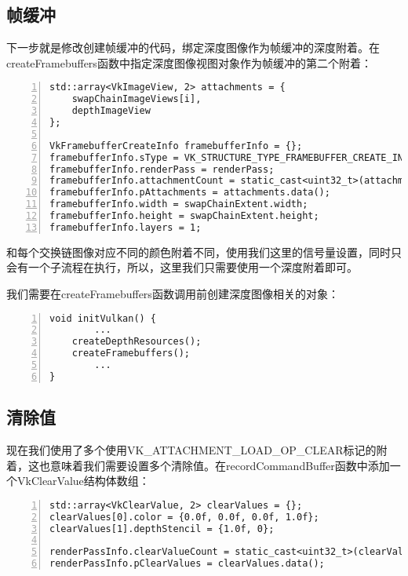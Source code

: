 \documentclass{ctexart}
\begin{document}
\subsection{帧缓冲}

下一步就是修改创建帧缓冲的代码，绑定深度图像作为帧缓冲的深度附着。在createFramebuffers函数中指定深度图像视图对象作为帧缓冲的第二个附着：

\begin{lstlisting}[language={[ANSI]C},keywordstyle=\color{blue!70},commentstyle=\color{red!50!green!50!blue!50},frame=shadowbox, rulesepcolor=\color{red!20!green!20!blue!20},basicstyle=\small,numbers=left, numberstyle=\tiny,breaklines=true]
std::array<VkImageView, 2> attachments = {
	swapChainImageViews[i],
	depthImageView
};

VkFramebufferCreateInfo framebufferInfo = {};
framebufferInfo.sType = VK_STRUCTURE_TYPE_FRAMEBUFFER_CREATE_INFO;
framebufferInfo.renderPass = renderPass;
framebufferInfo.attachmentCount = static_cast<uint32_t>(attachments.size());
framebufferInfo.pAttachments = attachments.data();
framebufferInfo.width = swapChainExtent.width;
framebufferInfo.height = swapChainExtent.height;
framebufferInfo.layers = 1;
\end{lstlisting}

和每个交换链图像对应不同的颜色附着不同，使用我们这里的信号量设置，同时只会有一个子流程在执行，所以，这里我们只需要使用一个深度附着即可。

我们需要在createFramebuffers函数调用前创建深度图像相关的对象：

\begin{lstlisting}[language={[ANSI]C},keywordstyle=\color{blue!70},commentstyle=\color{red!50!green!50!blue!50},frame=shadowbox, rulesepcolor=\color{red!20!green!20!blue!20},basicstyle=\small,numbers=left, numberstyle=\tiny,breaklines=true]
void initVulkan() {
		...
	createDepthResources();
	createFramebuffers();
		...
}
\end{lstlisting}

\subsection{清除值}

现在我们使用了多个使用VK\_ATTACHMENT\_LOAD\_OP\_CLEAR标记的附着，这也意味着我们需要设置多个清除值。在recordCommandBuffer函数中添加一个VkClearValue结构体数组：

\begin{lstlisting}[language={[ANSI]C},keywordstyle=\color{blue!70},commentstyle=\color{red!50!green!50!blue!50},frame=shadowbox, rulesepcolor=\color{red!20!green!20!blue!20},basicstyle=\small,numbers=left, numberstyle=\tiny,breaklines=true]
std::array<VkClearValue, 2> clearValues = {};
clearValues[0].color = {0.0f, 0.0f, 0.0f, 1.0f};
clearValues[1].depthStencil = {1.0f, 0};

renderPassInfo.clearValueCount = static_cast<uint32_t>(clearValues.size());
renderPassInfo.pClearValues = clearValues.data();
\end{lstlisting}
\end{document}

